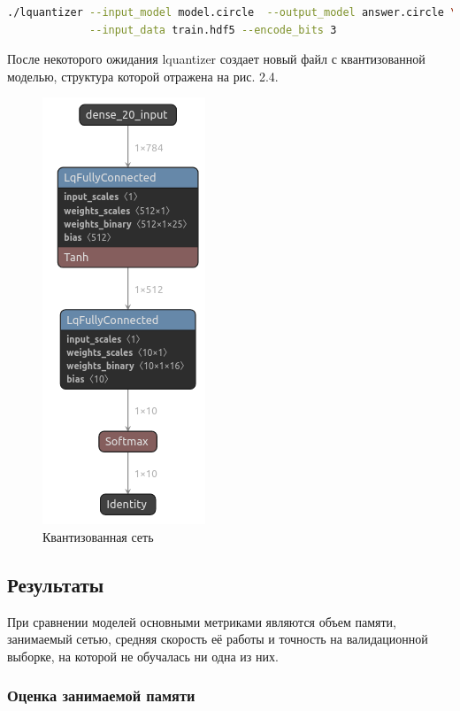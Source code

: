 \begin{lstlisting}[language=bash, caption={Пример запуска квантизатора}]
./lquantizer --input_model model.circle  --output_model answer.circle \
             --input_data train.hdf5 --encode_bits 3
\end{lstlisting}

После некоторого ожидания lquantizer создает новый файл с квантизованной моделью, структура которой отражена на рис. 2.4.

\begin{figure}[H]
    \begin{center}
        \includegraphics[scale=0.5]{tex/inc/img/lqcircle.png}
        \caption{Квантизованная сеть}
    \end{center}
\end{figure}

\subsection{Результаты}

При сравнении моделей основными метриками являются объем памяти, занимаемый сетью, средняя скорость её работы и точность на валидационной выборке, на которой не обучалась ни одна из них. 

\subsubsection{Оценка занимаемой памяти}

